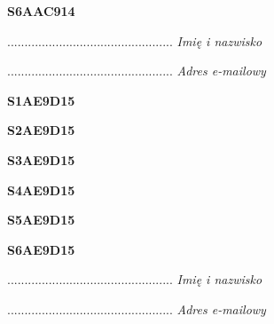 \begin{turn}{90}\huge \textbf{S6AAC914}\end{turn}

\begin{turn}{90}\begin{minipage}{\linewidth} \vspace{20mm} ................................................  \textit{Imię i nazwisko}\end{minipage}\end{turn}

\begin{turn}{90}\begin{minipage}{\linewidth} \vspace{20mm} ................................................  \textit{Adres e-mailowy}\end{minipage}\end{turn}

\begin{turn}{90}\huge \textbf{S1AE9D15}\end{turn}

\begin{turn}{90}\huge \textbf{S2AE9D15}\end{turn}

\begin{turn}{90}\huge \textbf{S3AE9D15}\end{turn}

\begin{turn}{90}\huge \textbf{S4AE9D15}\end{turn}

\begin{turn}{90}\huge \textbf{S5AE9D15}\end{turn}

\begin{turn}{90}\huge \textbf{S6AE9D15}\end{turn}

\begin{turn}{90}\begin{minipage}{\linewidth} \vspace{20mm} ................................................  \textit{Imię i nazwisko}\end{minipage}\end{turn}

\begin{turn}{90}\begin{minipage}{\linewidth} \vspace{20mm} ................................................  \textit{Adres e-mailowy}\end{minipage}\end{turn}

